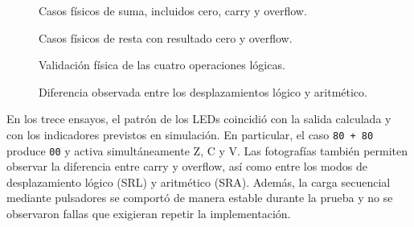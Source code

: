 \begin{figure}[H]
	\centering
	\hfill

	\par\vspace{0.8em}
	\hfill
	\caption{Casos físicos de suma, incluidos cero, carry y overflow.}%
	\label{fig:physical-add}
\end{figure}

\clearpage
\begin{figure}[H]
	\centering
	\hfill

	\par\vspace{0.8em}
	\caption{Casos físicos de resta con resultado cero y overflow.}%
	\label{fig:physical-sub}
\end{figure}

\clearpage
\begin{figure}[H]
	\centering
	\hfill

	\par\vspace{0.8em}
	\hfill
	\caption{Validación física de las cuatro operaciones lógicas.}%
	\label{fig:physical-logic}
\end{figure}

\clearpage
\begin{figure}[H]
	\centering
	\hfill
	\caption{Diferencia observada entre los desplazamientos lógico y aritmético.}%
	\label{fig:physical-shifts}
\end{figure}

En los trece ensayos, el patrón de los LEDs coincidió con la salida
calculada y con los indicadores previstos en simulación. En
particular, el caso \texttt{80 + 80} produce \texttt{00} y activa
simultáneamente Z, C y V. Las fotografías también permiten observar
la diferencia entre carry y overflow, así como entre los modos de
desplazamiento lógico (SRL) y aritmético (SRA). Además, la carga
secuencial mediante pulsadores se comportó de manera estable durante
la prueba y no se observaron fallas que exigieran repetir la implementación.
